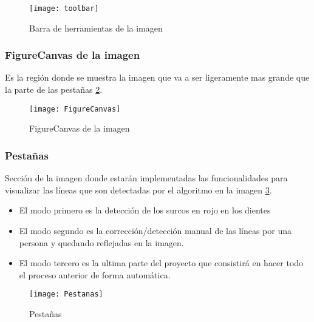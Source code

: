 \begin{figure}[h]
\centering
\texttt{[image: toolbar]}
\caption{Barra de herramientas de la imagen}\label{fig:5.11}
\end{figure}


\subsubsection{FigureCanvas de la imagen}
Es la región donde se muestra la imagen que va a ser ligeramente mas grande que la parte de las pestañas \ref{fig:5.12}.
\begin{figure}[h]
\centering
\texttt{[image: FigureCanvas]}
\caption{FigureCanvas de la imagen}
\label{fig:5.12}
\end{figure}


\subsubsection{Pestañas}
Sección de la imagen donde estarán implementadas las funcionalidades para visualizar las líneas que son detectadas por el algoritmo en la imagen \ref{fig:5.13}.
\begin{itemize}
\item El modo primero es la detección de los surcos en rojo en los dientes 
\item El modo segundo es la corrección/detección manual de las líneas por una persona y quedando reflejadas en la imagen.
\item El modo tercero es la ultima parte del proyecto que consistirá en hacer todo el proceso anterior de forma automática.
\end{itemize}

\begin{figure}[h]
\centering
\texttt{[image: Pestanas]}
\caption{Pestañas}
\label{fig:5.13}
\end{figure}

